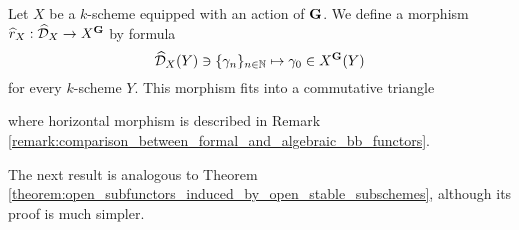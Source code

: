 \begin{remark}\label{remark:formal_bb_diagram}
Let $X$ be a $k$-scheme equipped with an action of $\mathbf{G}$. We define a morphism $\widehat{r}_X:\widehat{{\mathcal D}}_X\rightarrow X^{\mathbf{G}}$ by formula
$$\widehat{{\mathcal D}}_X(Y)\ni \{\gamma_n\}_{n\in {\mathbb N}} \mapsto \gamma_0 \in X^{\mathbf{G}}(Y)$$
for every $k$-scheme $Y$. This morphism fits into a commutative triangle
\begin{center}
\end{center}
where horizontal morphism is described in Remark \ref{remark:comparison_between_formal_and_algebraic_bb_functors}. 
\end{remark}
\noindent
The next result is analogous to Theorem \ref{theorem:open_subfunctors_induced_by_open_stable_subschemes}, although its proof is much simpler.

